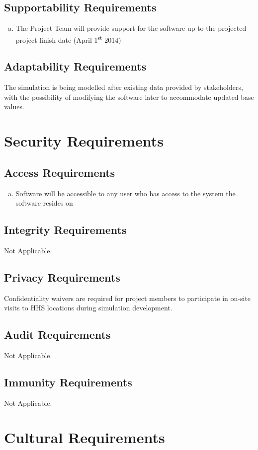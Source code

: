 \documentclass[paper=letter, fontsize=10pt]{scrartcl}
\numberwithin{equation}{section}		%
\numberwithin{figure}{section}			%
\numberwithin{table}{section}				%
\newcommand{\ts}{\textsuperscript}
\begin{document}
\subsection{Supportability Requirements}
	\begin{enumerate}[(a)]
		\item The Project Team will provide support for the software up to the projected project finish date (April 1\ts{st} 2014)
	\end{enumerate}
\subsection{Adaptability Requirements}
The simulation is being modelled after existing data provided by stakeholders, with the possibility of modifying the software later to accommodate updated base values. 

\section{Security Requirements}
\subsection{Access Requirements}
	\begin{enumerate}[(a)]
		\item Software will be accessible to any user who has access to the system the software resides on
	\end{enumerate}
\subsection{Integrity Requirements}
Not Applicable.
\subsection{Privacy Requirements}
Confidentiality waivers are required for project members to participate in on-site visits to HHS locations during simulation development.
\subsection{Audit Requirements}
Not Applicable.
\subsection{Immunity Requirements}
Not Applicable.

\section{Cultural Requirements}
\end{document}
